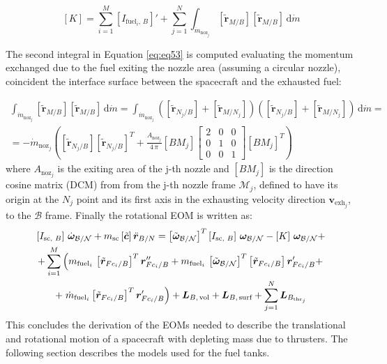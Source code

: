 \begin{equation}\label{eq:eq53}
	\left[K\right]= \sum_{i=1}^{M}\left[I_{\text{fuel}_i,\,B}\right] '	+\sum_{j=1}^{N} \int_{\dot{m}_{\text{noz}_j}}\left[\tilde{\bm{r}}_{M/B}\right] \left[\tilde{\bm{r}}_{M/B}\right]\,\text{d}\dot{m} 
\end{equation}

The second integral in Equation \eqref{eq:eq53} is computed evaluating the momentum exchanged due to the fuel exiting the nozzle area (assuming a circular nozzle), coincident the interface surface between the spacecraft and the exhausted fuel:

\begin{multline}
	\int_{\dot{m}_{\text{noz}_j}}\left[\tilde{\bm{r}}_{M/B}\right] \left[\tilde{\bm{r}}_{M/B}\right]\,\text{d}\dot{m} 
	=\int_{\dot{m}_{\text{noz}_j}}\left(\left[\tilde{\bm{r}}_{N_j/B}\right] + \left[\tilde{\bm{r}}_{M/N_j}\right]\right)\left(\left[\tilde{\bm{r}}_{N_j/B}\right] + \left[\tilde{\bm{r}}_{M/N_j}\right]\right)\,\text{d}\dot{m} =\\
	=-\dot{m}_{\text{noz}_j}\left(\left[\tilde{\bm{r}}_{N_j/B}\right]\left[\tilde{\bm{r}}_{N_j/B}\right]^T + \frac{A_{\text{noz}_j}}{4\,\pi}\left[BM_j\right]\left[\begin{matrix}
		2&0&0\\
		0&1&0\\
		0&0&1
	\end{matrix}\right]\left[BM_j\right]^T\right)
\end{multline}
\noindent
where $A_{\text{noz}_j}$ is the exiting area of the j-th nozzle and $\left[BM_j\right]$ is the direction cosine matrix (DCM) from from the j-th nozzle frame $\mathcal{M}_j$, defined to have its origin at the $N_j$ point and its first axis in the exhausting velocity direction $\bm{v}_{\text{exh}_j}$, to the $\mathcal{B}$ frame.
Finally the rotational EOM is written as:
\begin{multline}\label{eq:eq55}
	\left[I_{\text{sc, }B}\right]\,\dot{\bm{\omega}}_{\cal{B}/\cal{N}} + m_{\text{sc}} \left[\tilde{\bm{c}}\right]\ddot{\bm{r}}_{B/N}= \left[\tilde{\bm{\omega}}_{\cal{B}/\cal{N}}\right]^T\left[I_{\text{sc, }B}\right]\,\bm{\omega}_{\cal{B}/\cal{N}} - \left[K\right]\,\bm{\omega} _{\mathcal{B}/\mathcal{N}}+\\+ \sum_{i=1}^{M}\left(m_{\text{fuel}_i}\,\left[\tilde{\bm{r}}_{Fc_i/B}\right]^T \bm{r}''_{Fc_i/B} + 
	{m}_{\text{fuel}_i}\,
	\left[\tilde{\bm{\omega}}_{\mathcal{B}/\mathcal{N}}\right]^T \left[\tilde{\bm{r}}_{Fc_i/B}\right] \bm{r}'_{Fc_i/B}+\right.\\+\left.\dot{m}_{\text{fuel}_i} \left[\tilde{\bm{r}}_{Fc_i/B}\right]^T\bm{r}'_{Fc_i/B}\right)
	+ \bm{L}_{B,\,\text{vol}}+\bm{L}_{B,\,\text{surf}}  + \sum_{j=1}^{N}\bm{L}_{B_{\text{thr}_j}} 
\end{multline}
This concludes the derivation of the EOMs needed to describe the translational and rotational motion of a spacecraft with depleting mass due to thrusters. The following section describes the models used for the fuel tanks.


